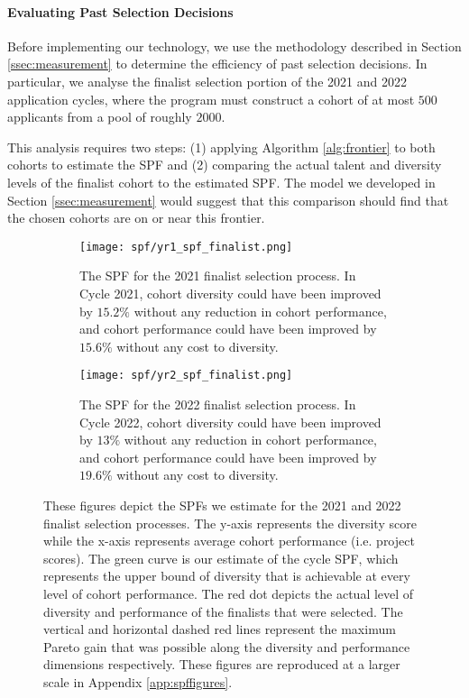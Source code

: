 \paragraph{Evaluating Past Selection Decisions} Before implementing our technology, we use the methodology described in Section \ref{ssec:measurement} to determine the efficiency of past selection decisions. In particular, we analyse the finalist selection portion of the 2021 and 2022 application cycles, where the program must construct a cohort of at most $500$ applicants from a pool of roughly $2000$. 

This analysis requires two steps: (1) applying Algorithm \ref{alg:frontier} to both cohorts to estimate the SPF and (2) comparing the actual talent and diversity levels of the finalist cohort to the estimated SPF. The model we developed in Section \ref{ssec:measurement} would suggest that this comparison should find that the chosen cohorts are on or near this frontier. 

\begin{figure}[htbp]
    \centering
    \begin{subfigure}[b]{0.45\textwidth}
        \texttt{[image: spf/yr1\_spf\_finalist.png]}
        \caption{The SPF for the 2021 finalist selection process. In Cycle 2021, cohort diversity could have been improved by $15.2\%$ without any reduction in cohort performance, and cohort performance could have been improved by $15.6\%$ without any cost to diversity.}
        \label{fig:spf_2021}
    \end{subfigure}
    \hfill
    \begin{subfigure}[b]{0.45\textwidth}
        \texttt{[image: spf/yr2\_spf\_finalist.png]}
        \caption{The SPF for the 2022 finalist selection process. In Cycle 2022, cohort diversity could have been improved by $13\%$ without any reduction in cohort performance, and cohort performance could have been improved by $19.6\%$ without any cost to diversity.}
        \label{fig:spf_2022}
    \end{subfigure}
    \caption{These figures depict the SPFs we estimate for the 2021 and 2022 finalist selection processes. The y-axis represents the diversity score while the x-axis represents average cohort performance (i.e. project scores). The green curve is our estimate of the cycle SPF, which represents the upper bound of diversity that is achievable at every level of cohort performance. The red dot depicts the actual level of diversity and performance of the finalists that were selected. The vertical and horizontal dashed red lines represent the maximum Pareto gain that was possible along the diversity and performance dimensions respectively. These figures are reproduced at a larger scale in Appendix \ref{app:spffigures}.}
    \label{fig:spf_2021_2022}
\end{figure}

